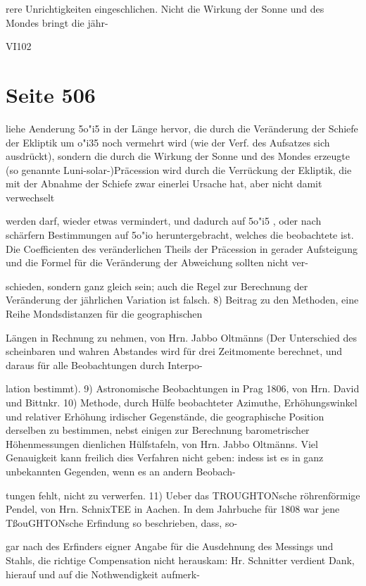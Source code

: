 \documentclass[10pt,a4paper]{article}
\begin{document}
rere Unrichtigkeiten eingeschlichen. Nicht die Wirkung der Sonne und des Mondes bringt die jähr-

VI102


\newpage
\section*{Seite 506}
liehe Aenderung 5o"i5 in der Länge hervor, die durch die Veränderung der Schiefe der Ekliptik um o"i35 noch vermehrt wird (wie der Verf. des Aufsatzes sich ausdrückt), sondern die durch die Wirkung der Sonne und des Mondes erzeugte (so genannte Luni-solar-)Präcession wird durch die Verrückung der Ekliptik, die mit der Abnahme der Schiefe zwar einerlei Ursache hat, aber nicht damit verwechselt

werden darf, wieder etwas vermindert, und dadurch auf 5o"i5 , oder nach schärfern Bestimmungen auf 5o"io heruntergebracht, welches die beobachtete ist. Die Coefficienten des veränderlichen Theils der Präcession in gerader Aufsteigung und die Formel für die Veränderung der Abweichung sollten nicht ver-

schieden, sondern ganz gleich sein; auch die Regel zur Berechnung der Veränderung der jährlichen Variation ist falsch. 8) Beitrag zu den Methoden, eine Reihe Mondsdistanzen für die geographischen

Längen in Rechnung zu nehmen, von Hrn. Jabbo Oltmänns (Der Unterschied des scheinbaren und wahren Abstandes wird für drei Zeitmomente berechnet, und daraus für alle Beobachtungen durch Interpo-

lation bestimmt). 9) Astronomische Beobachtungen in Prag 1806, von Hrn. David und Bittnkr. 10) Methode, durch Hülfe beobachteter Azimuthe, Erhöhungswinkel und relativer Erhöhung irdischer Gegenstände, die geographische Position derselben zu bestimmen, nebst einigen zur Berechnung barometrischer Höhenmessungen dienlichen Hülfstafeln, von Hrn. Jabbo Oltmänns. Viel Genauigkeit kann freilich dies Verfahren nicht geben: indess ist es in ganz unbekannten Gegenden, wenn es an andern Beobach-

tungen fehlt, nicht zu verwerfen. 11) Ueber das TROUGHTONsche röhrenförmige Pendel, von Hrn. SchnixTEE in Aachen. In dem Jahrbuche für 1808 war jene TßouGHTONsche Erfindung so beschrieben, dass, so-

gar nach des Erfinders eigner Angabe für die Ausdehnung des Messings und Stahls, die richtige Compensation nicht herauskam: Hr. Schnitter verdient Dank, hierauf und auf die Nothwendigkeit aufmerk-
\end{document}

